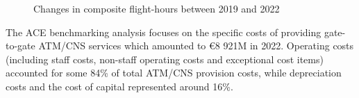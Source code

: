 \documentclass[
  letterpaper,
  DIV=11,
  numbers=noendperiod]{scrreprt}
\begin{document}
\begin{figure}


\caption{\label{fig-Traffic_map}Changes in composite flight-hours
between 2019 and 2022}

\end{figure}%

The ACE benchmarking analysis focuses on the specific costs of providing
gate-to-gate ATM/CNS services which amounted to €8 921M in 2022.
Operating costs (including staff costs, non-staff operating costs and
exceptional cost items) accounted for some 84\% of total ATM/CNS
provision costs, while depreciation costs and the cost of capital
represented around 16\%.
\end{document}
